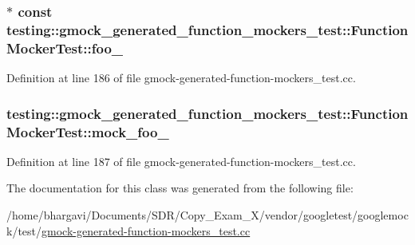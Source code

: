 \subsubsection[{\texorpdfstring{foo\+\_\+}{foo_}}]{$\ast$ const testing\+::gmock\+\_\+generated\+\_\+function\+\_\+mockers\+\_\+test\+::\+Function\+Mocker\+Test\+::foo\+\_\+\hspace{0.3cm}{\ttfamily [protected]}}\hypertarget{classtesting_1_1gmock__generated__function__mockers__test_1_1_function_mocker_test_ae2b8b577c4808f2dff9797168468f65f}{}\label{classtesting_1_1gmock__generated__function__mockers__test_1_1_function_mocker_test_ae2b8b577c4808f2dff9797168468f65f}


Definition at line 186 of file gmock-\/generated-\/function-\/mockers\+\_\+test.\+cc.

\subsubsection[{\texorpdfstring{mock\+\_\+foo\+\_\+}{mock_foo_}}]{ testing\+::gmock\+\_\+generated\+\_\+function\+\_\+mockers\+\_\+test\+::\+Function\+Mocker\+Test\+::mock\+\_\+foo\+\_\+\hspace{0.3cm}{\ttfamily [protected]}}\hypertarget{classtesting_1_1gmock__generated__function__mockers__test_1_1_function_mocker_test_a265659f07a0e75152ab295add4769585}{}\label{classtesting_1_1gmock__generated__function__mockers__test_1_1_function_mocker_test_a265659f07a0e75152ab295add4769585}


Definition at line 187 of file gmock-\/generated-\/function-\/mockers\+\_\+test.\+cc.



The documentation for this class was generated from the following file\+:\begin{DoxyCompactItemize}
\item 
/home/bhargavi/\+Documents/\+S\+D\+R/\+Copy\+\_\+\+Exam\+\_\+X/vendor/googletest/googlemock/test/\hyperlink{gmock-generated-function-mockers__test_8cc}{gmock-\/generated-\/function-\/mockers\+\_\+test.\+cc}\end{DoxyCompactItemize}

